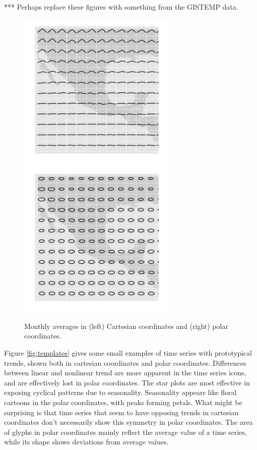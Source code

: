 \documentclass[oneside]{article}
\begin{document}
*** Perhaps replace these figures with something from the GISTEMP data.

\begin{figure}[htbp]
  \centering
  \includegraphics[width=3in]{month-cartesian}
  \includegraphics[width=3in]{month-polar}
    
  \caption{Monthly averages in (left) Cartesian coordinates and (right) polar coordinates.}
  
  \label{fig:cycle}
\end{figure}


Figure \ref{fig:templates} gives some small examples of time series with prototypical trends, shown both in cartesian coordinates and polar coordinates. Differences between linear and nonlinear trend are more apparent in the time series icons, and are effectively lost in polar coordinates. The star plots are most effective in exposing cyclical patterns due to seasonality. Seasonality appears like floral cartoons in the polar coordinates, with peaks forming petals. What might be surprising is that time series that seem to have opposing trends in cartesian coordinates don't necessarily show this symmetry in polar coordinates. The area of glyphs in polar coordinates mainly reflect the average value of a time series, while its shape shows deviations from average values. 
\end{document}
